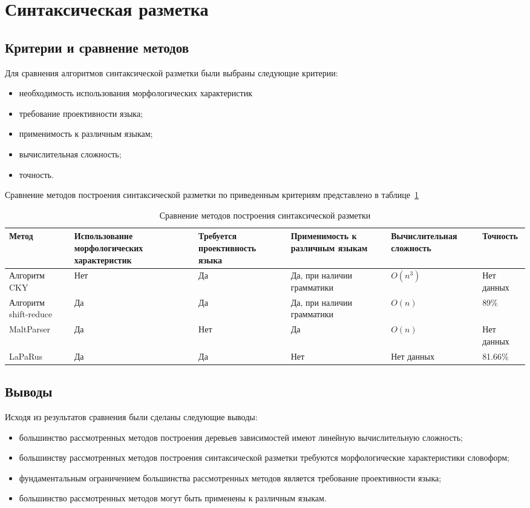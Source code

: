 \section{Синтаксическая разметка}
\subsection{Критерии и сравнение методов}
Для сравнения алгоритмов синтаксической разметки были выбраны следующие критерии:
\begin{itemize}
	\item необходимость использования морфологических характеристик
	\item требование проективности языка;
	\item применимость к различным языкам;
	\item вычислительная сложность;
	\item точность.
\end{itemize}

Сравнение методов построения синтаксической разметки по приведенным критериям представлено в таблице~\ref{tab:compare_synth}

\begin{table}
	\centering
	\caption{Сравнение методов построения синтаксической разметки}
	\begin{tabular}{|p{3cm}|p{4cm}|p{3cm}|p{3cm}|p{3cm}|p{3cm}|}
		\hline
		Метод & Использование морфологических характеристик & Требуется проективность языка & Применимость к различным языкам & Вычислительная сложность & Точность\\\hline
		Алгоритм CKY & Нет & Да & Да, при наличии грамматики & $O(n^3)$ & Нет данных\\\hline
		Алгоритм shift-reduce & Да & Да & Да, при наличии грамматики & $O(n)$ & 89\%\\\hline
		MaltParser & Да & Нет & Да & $O(n)$ & Нет данных\\\hline
		LaPaRus & Да & Да & Нет & Нет данных & 81.66\%\\\hline
	\end{tabular}
	\label{tab:compare_synth}
\end{table}

\subsection{Выводы}

Исходя из результатов сравнения были сделаны следующие выводы:
\begin{itemize}
	\item большинство рассмотренных методов построения деревьев зависимостей имеют линейную вычислительную сложность;
	\item большинству рассмотренных методов построения синтаксической разметки требуются морфологические характеристики словоформ;
	\item фундаментальным ограничением большинства рассмотренных методов является требование проективности языка;
	\item большинство рассмотренных методов могут быть применены к различным языкам.
\end{itemize}

